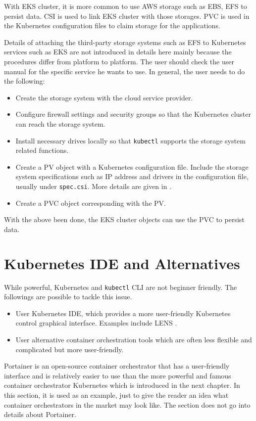 With EKS cluster, it is more common to use AWS storage such as EBS, EFS to persist data. CSI is used to link EKS cluster with those storages. PVC is used in the Kubernetes configuration files to claim storage for the applications.

Details of attaching the third-party storage systems such as EFS to Kubernetes services such as EKS are not introduced in details here mainly because the procedures differ from platform to platform. The user should check the user manual for the specific service he wants to use. In general, the user needs to do the following:
\begin{itemize}
  \item Create the storage system with the cloud service provider.
  \item Configure firewall settings and security groups so that the Kubernetes cluster can reach the storage system.
  \item Install necessary drives locally so that \verb|kubectl| supports the storage system related functions.
  \item Create a PV object with a Kubernetes configuration file. Include the storage system specifications such as IP address and drivers in the configuration file, usually under \texttt{spec.csi}. More details are given in \cite{kubernetes2024doc}.
  \item Create a PVC object corresponding with the PV.
\end{itemize}
With the above been done, the EKS cluster objects can use the PVC to persist data.

\section{Kubernetes IDE and Alternatives}

While powerful, Kubernetes and \verb|kubectl| CLI are not beginner friendly. The followings are possible to tackle this issue.
\begin{itemize}
  \item User Kubernetes IDE, which provides a more user-friendly Kubernetes control graphical interface. Examples include LENS \cite{lens2025homepace}. 
  \item User alternative container orchestration tools which are often less flexible and complicated but more user-friendly.
\end{itemize}

Portainer is an open-source container orchestrator that has a user-friendly interface and is relatively easier to use than the more powerful and famous container orchestrator Kubernetes which is introduced in the next chapter. In this section, it is used as an example, just to give the reader an idea what container orchestrators in the market may look like. The section does not go into details about Portainer.

